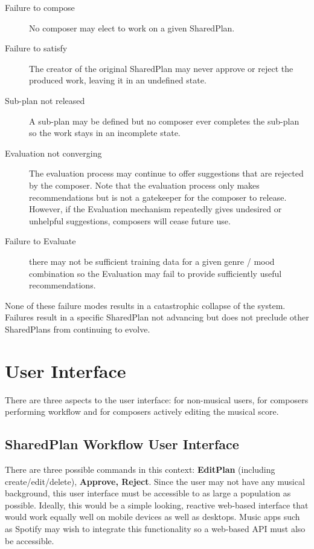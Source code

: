\documentclass[final,authoryear,5p,times,twocolumn]{elsarticle}
\begin{document}
\begin{description}
\item[Failure to compose] No composer may elect to work on a given SharedPlan.
\item[Failure to satisfy] The creator of the original SharedPlan may never approve or reject the produced work, leaving it in an undefined state.
\item[Sub-plan not released]A sub-plan may be defined but no composer ever completes the sub-plan so the work stays in an incomplete state.
\item[Evaluation not converging] The evaluation process may continue to offer suggestions that are rejected by the composer. Note that the evaluation process only makes recommendations but is not a gatekeeper for the composer to release. However, if the Evaluation mechanism repeatedly gives undesired or unhelpful suggestions, composers will cease future use.
\item[Failure to Evaluate] there may not be sufficient training data for a given genre / mood combination so the Evaluation may fail to provide sufficiently useful recommendations.
\end{description}

None of these failure modes results in a catastrophic collapse of the system. Failures result in a specific SharedPlan not advancing but does not preclude other SharedPlans from continuing to evolve.

\section{User Interface}

There are three aspects to the user interface: for non-musical users, for composers performing workflow and for composers actively editing the musical score.

\subsection{SharedPlan Workflow User Interface}

There are three possible commands in this context: \textbf{EditPlan} (including create/edit/delete), \textbf{Approve, Reject}. Since the user may not have any musical background, this user interface must be accessible to as large a population as possible. Ideally, this would be a simple looking, reactive web-based interface that would work equally well on mobile devices as well as desktops. Music apps such as Spotify may wish to integrate this functionality so a web-based API must also be accessible.
\end{document}
